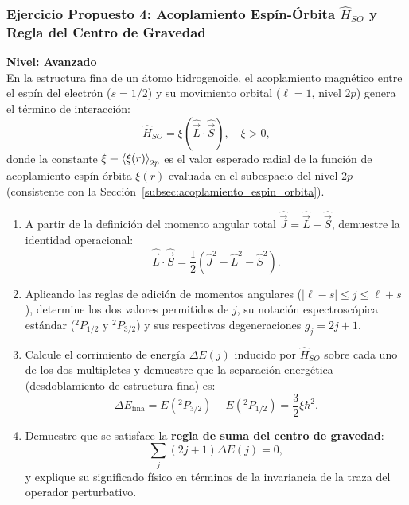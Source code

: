 \subsubsection[Ejercicio 4: Acoplamiento $LS$ y centro de gravedad]{Ejercicio Propuesto 4: Acoplamiento Espín-Órbita $\hat{H}_{SO}$ y Regla del Centro de Gravedad}
\begin{ejerciciobox}
    \textbf{Nivel: Avanzado}\\
    En la estructura fina de un átomo hidrogenoide, el acoplamiento magnético entre el espín del electrón ($s = 1/2$) y su movimiento orbital ($\ell = 1$, nivel $2p$) genera el término de interacción:
    \begin{equation}
        \hat{H}_{SO} = \xi(\hat{\vec{L}}\cdot\hat{\vec{S}}), \quad \xi > 0,
    \end{equation}
    donde la constante $\xi \equiv \left\langle \xi(r) \right\rangle_{2p}$ es el valor esperado radial de la función de acoplamiento espín-órbita $\xi(r)$ evaluada en el subespacio del nivel $2p$ (consistente con la Sección~\ref{subsec:acoplamiento_espin_orbita}).
    \begin{enumerate}
        \item A partir de la definición del momento angular total $\hat{\vec{J}} = \hat{\vec{L}} + \hat{\vec{S}}$, demuestre la identidad operacional:
        \begin{equation}
            \hat{\vec{L}}\cdot\hat{\vec{S}} = \frac{1}{2}\left( \hat{J}^2 - \hat{L}^2 - \hat{S}^2 \right).
        \end{equation}
        \item Aplicando las reglas de adición de momentos angulares ($|\ell - s| \le j \le \ell + s$), determine los dos valores permitidos de $j$, su notación espectroscópica estándar ($^2P_{1/2}$ y $^2P_{3/2}$) y sus respectivas degeneraciones $g_j = 2j + 1$.
        \item Calcule el corrimiento de energía $\Delta E(j)$ inducido por $\hat{H}_{SO}$ sobre cada uno de los dos multipletes y demuestre que la separación energética (desdoblamiento de estructura fina) es:
        \begin{equation}
            \Delta E_{\text{fina}} = E(^2P_{3/2}) - E(^2P_{1/2}) = \frac{3}{2}\xi\hbar^2.
        \end{equation}
        \item Demuestre que se satisface la \textbf{regla de suma del centro de gravedad}:
        \begin{equation}
            \sum_j (2j + 1)\Delta E(j) = 0,
        \end{equation}
        y explique su significado físico en términos de la invariancia de la traza del operador perturbativo.
    \end{enumerate}
\end{ejerciciobox}

